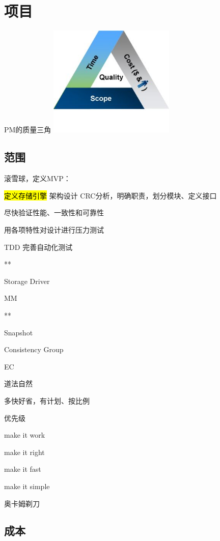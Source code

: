 \chapter{项目}

PM的质量三角
\includegraphics[width=6cm]{../imgs/quality.jpeg}

\section{范围}

滚雪球，定义MVP：
\begin{enumbox}
\item \hl{定义存储引擎} 架构设计 CRC分析，明确职责，划分模块、定义接口
\item 尽快验证性能、一致性和可靠性
\item 用各项特性对设计进行压力测试
\item TDD 完善自动化测试
\item ***
\item Storage Driver
\item MM
\item ***
\item Snapshot
\item Consistency Group
\item EC
\end{enumbox}

道法自然

多快好省，有计划、按比例

优先级
\begin{enumbox}
\item make it work
\item make it right
\item make it fast
\item make it simple
\end{enumbox}

奥卡姆剃刀

\section{成本}

